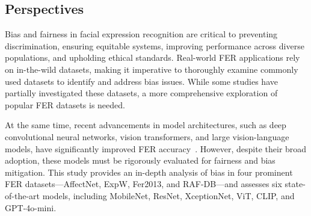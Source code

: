 \subsection{Perspectives}
Bias and fairness in facial expression recognition are critical to preventing discrimination, ensuring equitable systems, improving performance across diverse populations, and upholding ethical standards. Real-world FER applications rely on in-the-wild datasets, making it imperative to thoroughly examine commonly used datasets to identify and address bias issues. While some studies have partially investigated these datasets, a more comprehensive exploration of popular FER datasets is needed.

At the same time, recent advancements in model architectures, such as deep convolutional neural networks, vision transformers, and large vision-language models, have significantly improved FER accuracy~\cite{rodrigo2024comprehensive, aldahoul2024exploring, zhao2024enhancing}. However, despite their broad adoption, these models must be rigorously evaluated for fairness and bias mitigation. This study provides an in-depth analysis of bias in four prominent FER datasets—AffectNet, ExpW, Fer2013, and RAF-DB—and assesses six state-of-the-art models, including MobileNet, ResNet, XceptionNet, ViT, CLIP, and GPT-4o-mini.

